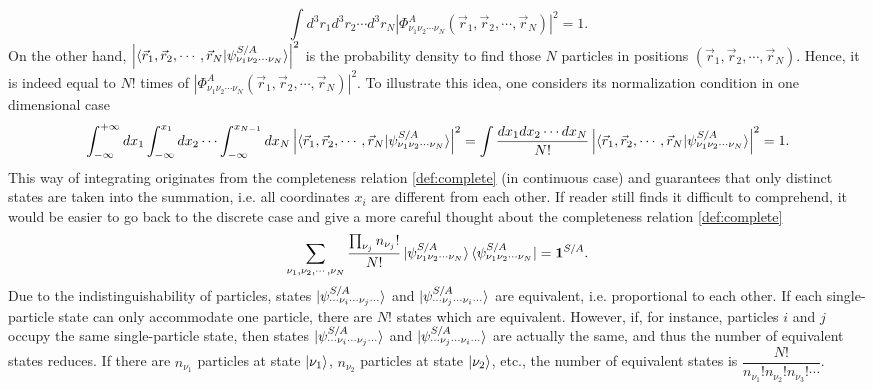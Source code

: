 \documentclass[a4paper,12pts]{article}
\numberwithin{equation}{section}
\begin{document}
	\begin{equation}
	\int d^3r_1d^3r_2\cdots d^3r_N\left|\Phi_{\nu_1\nu_2\cdots\nu_N}^A(\vec{r}_1,\vec{r}_2,\cdots,\vec{r}_N)\right|^2 = 1.
	\end{equation}
	On the other hand, $\left|\braket{\vec{r}_1,\vec{r}_2,\cdots,\vec{r}_N|\psi_{\nu_1\nu_2\cdots\nu_N}^{S/A}}\right|^2$ is the probability density to find those $N$ particles in positions $(\vec{r}_1,\vec{r}_2,\cdots,\vec{r}_N)$. Hence, it is indeed equal to $N!$ times of $\left|\Phi_{\nu_1\nu_2\cdots\nu_N}^A(\vec{r}_1,\vec{r}_2,\cdots,\vec{r}_N)\right|^2$. To illustrate this idea, one considers its normalization condition in one dimensional case
	\begin{equation}
	\int_{-\infty}^{+\infty}dx_1\int_{-\infty}^{x_1}dx_2\cdots\int_{-\infty}^{x_{N-1}}dx_N\left|\braket{\vec{r}_1,\vec{r}_2,\cdots,\vec{r}_N|\psi_{\nu_1\nu_2\cdots\nu_N}^{S/A}}\right|^2 = \int\frac{dx_1dx_2\cdots dx_N}{N!} \left|\braket{\vec{r}_1,\vec{r}_2,\cdots,\vec{r}_N|\psi_{\nu_1\nu_2\cdots\nu_N}^{S/A}}\right|^2 = 1.
	\end{equation}
	This way of integrating originates from the completeness relation \ref{def:complete} (in continuous case) and guarantees that only distinct states are taken into the summation, i.e. all coordinates $x_i$ are different from each other.\bigbreak
	If reader still finds it difficult to comprehend, it would be easier to go back to the discrete case and give a more careful thought about the completeness relation \ref{def:complete}
	\begin{equation*}
	\sum_{\nu_1,\nu_2,\cdots,\nu_N}\frac{\prod_{\nu_j}n_{\nu_j}!}{N!} \ket{\psi_{\nu_1\nu_2\cdots\nu_N}^{S/A}}\bra{\psi_{\nu_1\nu_2\cdots\nu_N}^{S/A}}= \mathbf{1}^{S/A}.
	\end{equation*}
	Due to the indistinguishability of particles, states $\ket{\psi_{\cdots\nu_i\cdots\nu_j\cdots}^{S/A}}$ and $\ket{\psi_{\cdots\nu_j\cdots\nu_i\cdots}^{S/A}}$ are equivalent, i.e. proportional to each other. If each single-particle state can only accommodate one particle, there are $N!$ states which are equivalent. However, if, for instance, particles $i$ and $j$ occupy the same single-particle state, then states $\ket{\psi_{\cdots\nu_i\cdots\nu_j\cdots}^{S/A}}$ and $\ket{\psi_{\cdots\nu_j\cdots\nu_i\cdots}^{S/A}}$ are actually the same, and thus the number of equivalent states reduces. If there are $n_{\nu_1}$ particles at state $\ket{\nu_1}$, $n_{\nu_2}$ particles at state $\ket{\nu_2}$, etc., the number of equivalent states is $\dfrac{N!}{n_{\nu_1}!n_{\nu_2}!n_{\nu_3}!\cdots}$.
\end{document}
